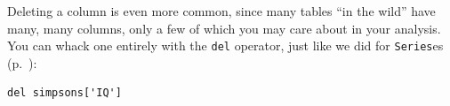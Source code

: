 \begin{samepage}

Deleting a column is even more common, since many tables ``in the wild'' have
many, many columns, only a few of which you may care about in your analysis.
You can whack one entirely with the \texttt{del} operator, just like we did for
\texttt{Series}es (p.~\pageref{delOp}):

\begin{Verbatim}[fontsize=\small,samepage=true,frame=single,framesep=3mm]
del simpsons['IQ']
\end{Verbatim}
\end{samepage}

